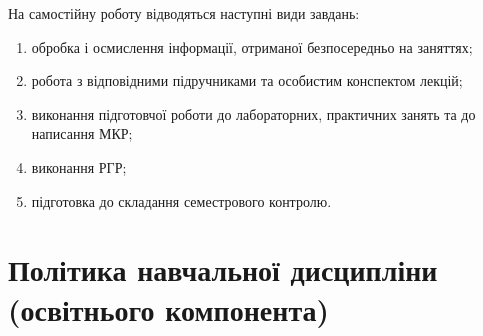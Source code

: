 \documentclass{Syllabus}
\begin{document}
На самостійну роботу відводяться наступні види завдань:
\begin{enumerate}[label=$\bullet$]
\item обробка і осмислення інформації, отриманої безпосередньо на заняттях;
\item робота з відповідними підручниками та особистим конспектом лекцій;
\item виконання підготовчої роботи до лабораторних, практичних занять та до написання МКР;
\item виконання РГР;
\item підготовка до складання семестрового контролю.
\end{enumerate}

%




\section{Політика навчальної дисципліни (освітнього компонента)}

\end{document}
